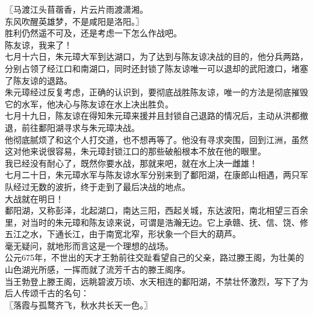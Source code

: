 \begin{multicols}{\theparacolNo}
〖马渡江头苜蓿香，片云片雨渡潇湘。\\

东风吹醒英雄梦，不是咸阳是洛阳。〗\\

胜利仍然遥不可及，还是考虑一下怎么作战吧。\\

陈友谅，我来了！\\

七月十六日，朱元璋大军到达湖口，为了达到与陈友谅决战的目的，他分兵两路，分别占领了经江口和南湖口，同时还封锁了陈友谅唯一可以退却的武阳渡口，堵塞了陈友谅的退路。\\

朱元璋经过反复考虑，正确的认识到，要彻底战胜陈友谅，唯一的方法是彻底摧毁它的水军，他决心与陈友谅在水上决出胜负。\\

七月十九日，陈友谅在得知朱元璋来援并且封锁自己退路的情况后，主动从洪都撤退，前往鄱阳湖寻求与朱元璋决战。\\

他彻底腻烦了和这个人打交道，也不想再等了。他没有寻求突围，回到江洲，虽然这对他来说很容易，朱元璋封锁江口的那些破船根本不放在他的眼里。\\

我已经没有耐心了，既然你要水战，那就来吧，就在水上决一雌雄！\\

七月二十日，朱元璋水军与陈友谅水军分别来到了鄱阳湖，在康郎山相遇，两只军队经过无数的波折，终于走到了最后决战的地点。\\

大战就在明日！\\

鄱阳湖，又称彭泽，北起湖口，南达三阳，西起关城，东达波阳，南北相望三百余里，对当时的朱元璋和陈友谅来说，可谓是浩瀚无边。它上承赣、抚、信、饶、修五江之水，下通长江，由于南宽北窄，形状象一个巨大的葫芦。\\

毫无疑问，就地形而言这是一个理想的战场。\\

公元675年，不世出的天才王勃前往交趾看望自己的父亲，路过滕王阁，为壮美的山色湖光所感，一挥而就了流芳千古的滕王阁序。\\

当王勃登上滕王阁，远眺碧波万顷、水天相连的鄱阳湖，不禁壮怀激烈，写下了为后人传颂千古的名句：\\

〖落霞与孤鹜齐飞，秋水共长天一色。〗\\


\end{multicols}

